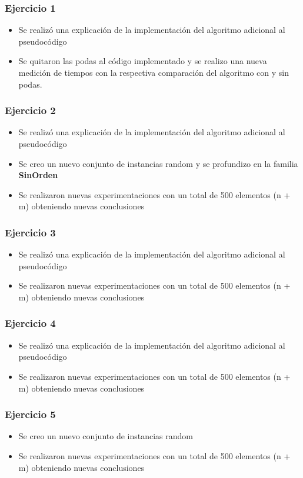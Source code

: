 \subsubsection{Ejercicio 1}
\begin{itemize}
\item Se realiz\'o una explicaci\'on de la implementaci\'on del algoritmo adicional al pseudoc\'odigo
\item Se quitaron las podas al c\'odigo implementado y se realizo una nueva medici\'on de tiempos con la respectiva comparaci\'on del algoritmo con y sin podas.
\end{itemize}

\subsubsection{Ejercicio 2}
\begin{itemize}
\item Se realiz\'o una explicaci\'on de la implementaci\'on del algoritmo adicional al pseudoc\'odigo
\item Se creo un nuevo conjunto de instancias random y se profundizo en la familia \textbf{SinOrden}
\item Se realizaron nuevas experimentaciones con un total de 500 elementos (n + m) obteniendo nuevas conclusiones
\end{itemize}

\subsubsection{Ejercicio 3}
\begin{itemize}
\item Se realiz\'o una explicaci\'on de la implementaci\'on del algoritmo adicional al pseudoc\'odigo
\item Se realizaron nuevas experimentaciones con un total de 500 elementos (n + m) obteniendo nuevas conclusiones
\end{itemize}

\subsubsection{Ejercicio 4}
\begin{itemize}
\item Se realiz\'o una explicaci\'on de la implementaci\'on del algoritmo adicional al pseudoc\'odigo
\item Se realizaron nuevas experimentaciones con un total de 500 elementos (n + m) obteniendo nuevas conclusiones
\end{itemize}

\subsubsection{Ejercicio 5}
\begin{itemize}
\item Se creo un nuevo conjunto de instancias random
\item Se realizaron nuevas experimentaciones con un total de 500 elementos (n + m) obteniendo nuevas conclusiones
\end{itemize}
